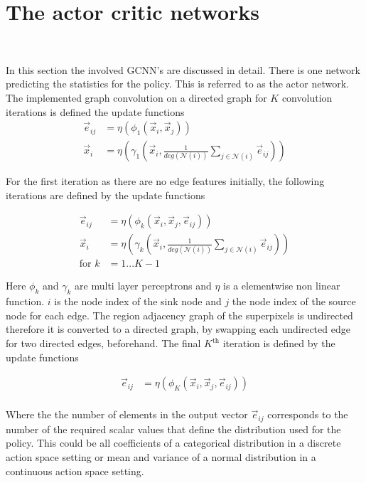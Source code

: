 \section{The actor critic networks}~\label{seg:sag_gcn}

In this section the involved GCNN's are discussed in detail. There is one network predicting the statistics for the policy. This is referred to as the actor network. The implemented graph convolution on a directed graph for $K$ convolution iterations is defined the update functions\\

\begin{align}
\vec{e}_{ij} &= \eta \left( \phi_1 \left(\vec{x}_i, \vec{x}_j \right)\right)\\
\vec{x}_i &= \eta \left( \gamma_1 \left(\vec{x}_i, \frac{1}{deg(\mathcal{N}(i))} \sum_{j \in \mathcal{N}(i)}  \vec{e}_{ij} \right)\right)
\end{align}

For the first iteration as there are no edge features initially, the following iterations are defined by the update functions

\begin{align}
\vec{e}_{ij} &= \eta \left( \phi_k \left(\vec{x}_i, \vec{x}_j, \vec{e}_{ij} \right)\right)\\
\vec{x}_i &= \eta \left( \gamma_k \left(\vec{x}_i, \frac{1}{deg(\mathcal{N}(i))} \sum_{j \in \mathcal{N}(i)}  \vec{e}_{ij} \right) \right)\\
\text{for }k&=1...K-1
\end{align}

Here $\phi_k$ and $\gamma_k$ are multi layer perceptrons and $\eta$ is a elementwise non linear function. $i$ is the node index of the sink node and $j$ the node index of the source node for each edge. The region adjacency graph of the superpixels is undirected therefore it is converted to a directed graph, by swapping each undirected edge for two directed edges, beforehand. The final $K^{\text{th}}$ iteration is defined by the update functions

\begin{align}
\vec{e}_{ij} &= \eta \left( \phi_K \left(\vec{x}_i, \vec{x}_j, \vec{e}_{ij} \right)\right)\\
\end{align}

Where the the number of elements in the output vector $\vec{e}_{ij}$ corresponds to the number of the required scalar values that define the distribution used for the policy. This could be all coefficients of a categorical distribution in a discrete action space setting or mean and variance of a normal distribution in a continuous action space setting.\\

